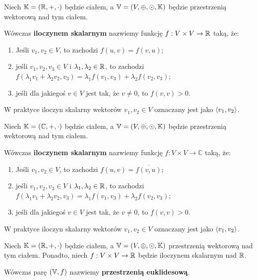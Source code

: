 \begin{definition}
	Niech \(\mathbb{K} = (\mathbb{R}, +, \cdot)\) będzie ciałem, a \(\mathbb{V} = (V, \oplus, \odot, \mathbb{K})\) będzie przestrzenią wektorową nad tym ciałem.

	Wówczas \textbf{iloczynem skalarnym} nazwiemy funkcję \(f: V \times V \rightarrow \mathbb{R}\) taką, że:

	\begin{enumerate}
		\item Jeśli \(v_1, v_2 \in V\), to zachodzi \(f(u,v) = f(v,u)\);
		\item jeśli \(v_1, v_2, v_3 \in V\) i \(\lambda_1, \lambda_2 \in \mathbb{R}\), to zachodzi \(f(\lambda_1 v_1 + \lambda_2 v_2, v_3) = \lambda_1 f(v_1, v_3) + \lambda_2 f(v_2, v_3) \);
		\item jeśli dla jakiegoś \(v \in V\) jest tak, że \(v \not = 0\), to \(f(v,v) > 0\).
	\end{enumerate}

	W praktyce iloczyn skalarny wektorów \(v_1, v_2 \in V\) oznaczany jest jako \(\langle v_1, v_2 \rangle\).
\end{definition}

\begin{definition}
	Niech \(\mathbb{K} = (\mathbb{C}, +, \cdot)\) będzie ciałem, a \(\mathbb{V} = (V, \oplus, \odot, \mathbb{K})\) będzie przestrzenią wektorową nad tym ciałem.

	Wówczas \textbf{iloczynem skalarnym} nazwiemy funkcję \(f: V \times V \rightarrow \mathbb{C}\) taką, że:

	\begin{enumerate}
		\item Jeśli \(v_1, v_2 \in V\), to zachodzi \(f(u,v) = \overline{f(v,u)}\);
		\item jeśli \(v_1, v_2, v_3 \in V\) i \(\lambda_1, \lambda_2 \in \mathbb{R}\), to zachodzi \(f(\lambda_1 v_1 + \lambda_2 v_2, v_3) = \lambda_1 f(v_1, v_3) + \lambda_2 f(v_2, v_3) \);
		\item jeśli dla jakiegoś \(v \in V\) jest tak, że \(v \not = 0\), to \(f(v,v) > 0\).
	\end{enumerate}

	W praktyce iloczyn skalarny wektorów \(v_1, v_2 \in V\) oznaczany jest jako \(\langle v_1, v_2 \rangle\).
\end{definition}

\begin{definition}
	Niech \(\mathbb{K} = (\mathbb{R}, +, \cdot)\) będzie ciałem, a \(\mathbb{V} = (V, \oplus, \odot, \mathbb{K})\) przestrzenią wektorową nad tym ciałem. Ponadto, niech \(f: V \times V \rightarrow \mathbb{R}\) będzie iloczynem skalarnym nad \(\mathbb{R}\).

	Wówczas parę \((\mathbb{V}, f)\) nazwiemy \textbf{przestrzenią euklidesową}.
\end{definition}

